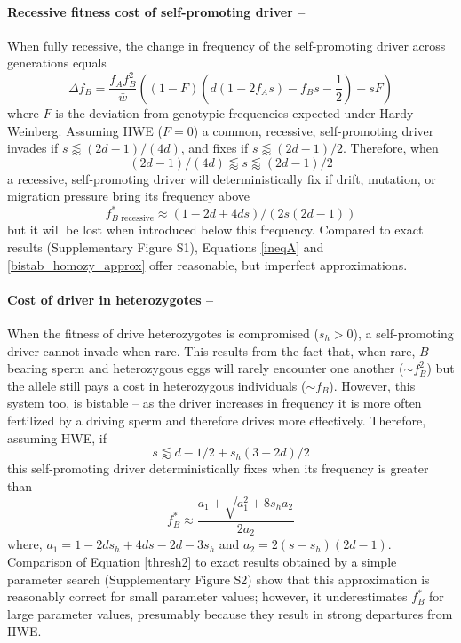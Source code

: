\documentclass{pnastwo}
\begin{document}
\begin{article}
\paragraph{Recessive fitness cost of self-promoting driver -- }
When fully recessive, the change in frequency of the self-promoting driver across generations equals 
\begin{equation}
\Delta f_B=\frac{f_A f_B^2}{\bar{w}} \left( \left(1-F\right)\left( d\left(1-2 f_A s\right) - f_B s-\frac{1}{2}\right) - s  F \right)
\label{deltadriver}
\end{equation}
where $F$ is the deviation from genotypic frequencies expected under Hardy-Weinberg. 
Assuming HWE  ($F=0$) a common, recessive, self-promoting driver invades if $s\lessapprox(2 d - 1)/(4 d)$, and fixes if
 $s\lessapprox(2d-1)/2$. 
 Therefore, when 
\begin{equation}
(2 d - 1)/(4 d)  \lessapprox  s  \lessapprox  (2d-1)/2\label{ineqA}
\end{equation} 
a recessive, self-promoting driver will deterministically fix if drift,
 	mutation, or migration pressure bring its frequency above
\begin{equation} 
f^*_{B\text{ recessive}} \approx (1-2d+4ds)/(2s(2d-1)) \label{bistab_homozy_approx}
\end{equation}
 but it will be lost when introduced below this frequency. 
 Compared to exact results (Supplementary Figure S1), Equations
 \eqref{ineqA} and \eqref{bistab_homozy_approx} offer reasonable, but imperfect approximations. 
 
 
 \paragraph{Cost of driver in heterozygotes -- } 
When the fitness of drive heterozygotes is compromised ($s_h>0$), a self-promoting driver cannot invade when rare.
This results from the fact that,
when rare, 
$B$-bearing sperm and heterozygous eggs will rarely encounter one another ($\sim f_B^2$) but the allele still pays a
cost in heterozygous individuals ($\sim f_B$). 
However, this system too, is bistable -- as the driver increases in frequency it is more often fertilized by a driving sperm and therefore drives more effectively. 
Therefore, assuming HWE, if 
\begin{equation}
	s \lessapprox  d -1/2 +s_h(3-2d)/2
	\label{sForHetFix}
\end{equation}
this self-promoting driver deterministically fixes when its frequency is greater than
\begin{equation}
	f_B^* \approx \frac{a_1+\sqrt{a_1^2+8 s_h a_2}}{2 a_2}
	\label{thresh2}
\end{equation}
where, $a_1=1-2 ds_h+4 d s-2 d-3 s_h$ and $a_2=2(s-s_h)(2d-1)$.
Comparison of Equation \ref{thresh2} to exact results obtained by a
simple parameter search (Supplementary Figure S2)
show that this approximation is reasonably correct for small
parameter values; however, it underestimates $f_B^*$ for large parameter values, presumably because they result in strong departures from HWE.



\end{article}
\end{document}
